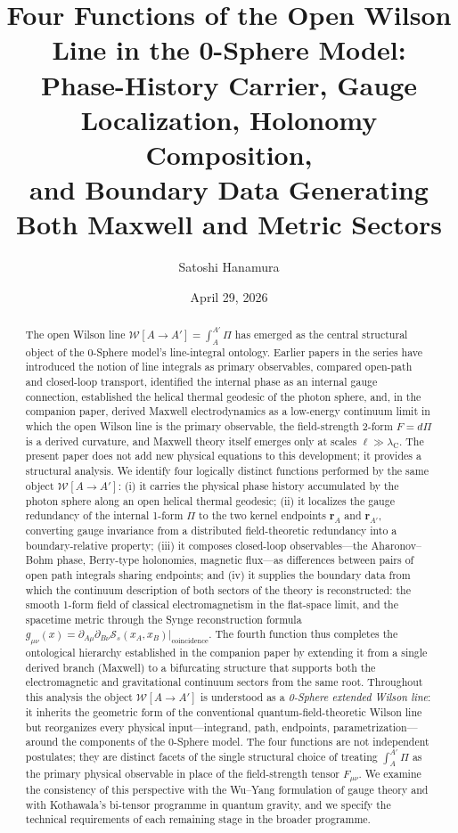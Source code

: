 \documentclass[%
 reprint, amsmath,amssymb, aps, prb, ]{revtex4-2}
\numberwithin{equation}{section}
\newcommand{\WL}{\mathcal{W}}
\newcommand{\lambdaC}{\lambda_{\mathrm{C}}}
\begin{document}
\title{Four Functions of the Open Wilson Line in the 0-Sphere Model:\\
Phase-History Carrier, Gauge Localization, Holonomy Composition,\\
and Boundary Data Generating Both Maxwell and Metric Sectors}

\author{Satoshi Hanamura}
\date{April 29, 2026}

\begin{abstract}
The open Wilson line $\WL[A\!\to\!A'] = \int_A^{A'}\Pi$ has emerged as the central structural object of the 0-Sphere model's line-integral ontology. Earlier papers in the series have introduced the notion of line integrals as primary observables, compared open-path and closed-loop transport, identified the internal phase as an internal gauge connection, established the helical thermal geodesic of the photon sphere, and, in the companion paper, derived Maxwell electrodynamics as a low-energy continuum limit in which the open Wilson line is the primary observable, the field-strength 2-form $F = d\Pi$ is a derived curvature, and Maxwell theory itself emerges only at scales $\ell \gg \lambdaC$. The present paper does not add new physical equations to this development; it provides a structural analysis. We identify four logically distinct functions performed by the same object $\WL[A\to A']$: (i) it carries the physical phase history accumulated by the photon sphere along an open helical thermal geodesic; (ii) it localizes the gauge redundancy of the internal 1-form $\Pi$ to the two kernel endpoints $\mathbf{r}_A$ and $\mathbf{r}_{A'}$, converting gauge invariance from a distributed field-theoretic redundancy into a boundary-relative property; (iii) it composes closed-loop observables---the Aharonov--Bohm phase, Berry-type holonomies, magnetic flux---as differences between pairs of open path integrals sharing endpoints; and (iv) it supplies the boundary data from which the continuum description of both sectors of the theory is reconstructed: the smooth 1-form field of classical electromagnetism in the flat-space limit, and the spacetime metric through the Synge reconstruction formula $g_{\mu\nu}(x) = \partial_{A\mu}\partial_{B\nu}\mathcal{S}_s(x_A,x_B)|_{\text{coincidence}}$. The fourth function thus completes the ontological hierarchy established in the companion paper by extending it from a single derived branch (Maxwell) to a bifurcating structure that supports both the electromagnetic and gravitational continuum sectors from the same root. Throughout this analysis the object $\WL[A\to A']$ is understood as a \emph{0-Sphere extended Wilson line}: it inherits the geometric form of the conventional quantum-field-theoretic Wilson line but reorganizes every physical input---integrand, path, endpoints, parametrization---around the components of the 0-Sphere model. The four functions are not independent postulates; they are distinct facets of the single structural choice of treating $\int_A^{A'}\Pi$ as the primary physical observable in place of the field-strength tensor $F_{\mu\nu}$. We examine the consistency of this perspective with the Wu--Yang formulation of gauge theory and with Kothawala's bi-tensor programme in quantum gravity, and we specify the technical requirements of each remaining stage in the broader programme.

\end{abstract}
\end{document}

